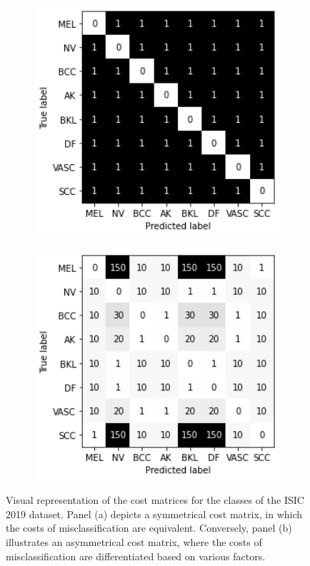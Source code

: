 \begin{figure}[!h]
	\centering
	\begin{subfigure}{0.49\textwidth}
		\centering
		\includegraphics[width=1\textwidth]{images/cost_matrix_1.png}
		\caption{}
		\label{fig:multiclasssymcosts}
	\end{subfigure}
	\begin{subfigure}{0.49\textwidth}
		\centering
		\includegraphics[width=1\textwidth]{images/cost_matrix_2.png}
		\caption{}
		\label{fig:multiclassasymcosts}
	\end{subfigure}
	\caption{Visual representation of the cost matrices for the classes of the ISIC 2019 dataset. Panel (a) depicts a symmetrical cost matrix, in which the costs of misclassification are equivalent. Conversely, panel (b) illustrates an asymmetrical cost matrix, where the costs of misclassification are differentiated based on various factors.}
	\label{fig:multiclasscosts}
\end{figure}

